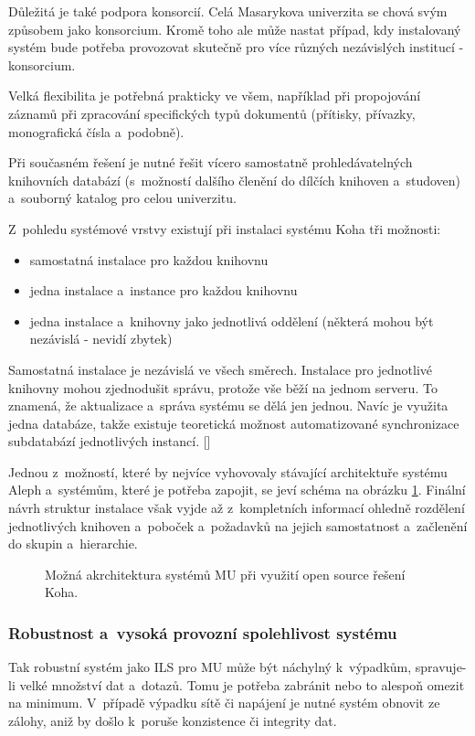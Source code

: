 \documentclass[
	11pt, oneside, printed, final, palatino, monochrome
	microtype,
	table,   %
	lof,     %
	lot     %
]{fithesis3}
\newcommand{\citepages}[2]{[\cite[#1]{#2}]}
\begin{document}
{Důležitá je také podpora konsorcií. Celá Masarykova univerzita se chová svým způsobem jako konsorcium. Kromě toho ale může nastat případ, kdy instalovaný systém bude potřeba provozovat skutečně pro více různých nezávislých institucí - konsorcium.

Velká flexibilita je potřebná prakticky ve všem, například při propojování záznamů při zpracování specifických typů dokumentů (přítisky, přívazky, monografická čísla a~podobně).

Při současném řešení je nutné řešit vícero samostatně prohledávatelných knihovních databází (s~možností dalšího členění do dílčích knihoven a~studoven) a~souborný katalog pro celou univerzitu.

Z~pohledu systémové vrstvy existují při instalaci systému Koha tři možnosti:

\begin{itemize}
\item samostatná instalace pro každou knihovnu
\item jedna instalace a~instance pro každou knihovnu
\item jedna instalace a~knihovny jako jednotlivá oddělení (některá mohou být nezávislá - nevidí zbytek)
\end{itemize}

Samostatná instalace je nezávislá ve všech směrech.
Instalace pro jednotlivé knihovny mohou zjednodušit správu, protože vše běží na jednom serveru. To znamená, že aktualizace a~správa systému se dělá jen jednou. Navíc je využita jedna databáze, takže existuje teoretická možnost automatizované synchronizace subdatabází jednotlivých instancí. \citepages{19-21}{breeding_2012}

Jednou z~možností, které by nejvíce vyhovovaly stávající architektuře systému Aleph a~systémům, které je potřeba zapojit, se jeví schéma na obrázku \ref{fig:koha}. Finální návrh struktur instalace však vyjde až z~kompletních informací ohledně rozdělení jednotlivých knihoven a~poboček a~požadavků na jejich samostatnost a~začlenění do skupin a~hierarchie.

\begin{figure}
    \centering
	\def\svgwidth{1.27\textwidth}
    
	\caption{Možná akrchitektura systémů MU při využití open source řešení Koha.}
	\label{fig:koha}
\end{figure}

\subsubsection{Robustnost a~vysoká provozní spolehlivost systému}
Tak robustní systém jako ILS pro MU může být náchylný k~výpadkům, spravuje-li velké množství dat a~dotazů. Tomu je potřeba zabránit nebo to alespoň omezit na minimum. V~případě výpadku sítě či napájení je nutné systém obnovit ze zálohy, aniž by došlo k~poruše konzistence či integrity dat.

}
\end{document}

